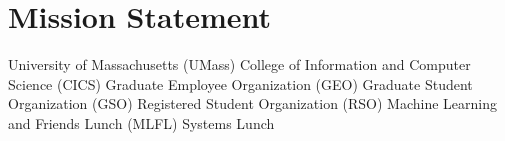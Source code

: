 \section{Mission Statement}
\label{sec:mission}
University of Massachusetts (UMass)
College of Information and Computer Science (CICS)
Graduate Employee Organization (GEO)
Graduate Student Organization (GSO)	
Registered Student Organization (RSO)
Machine Learning and Friends Lunch (MLFL)
Systems Lunch
